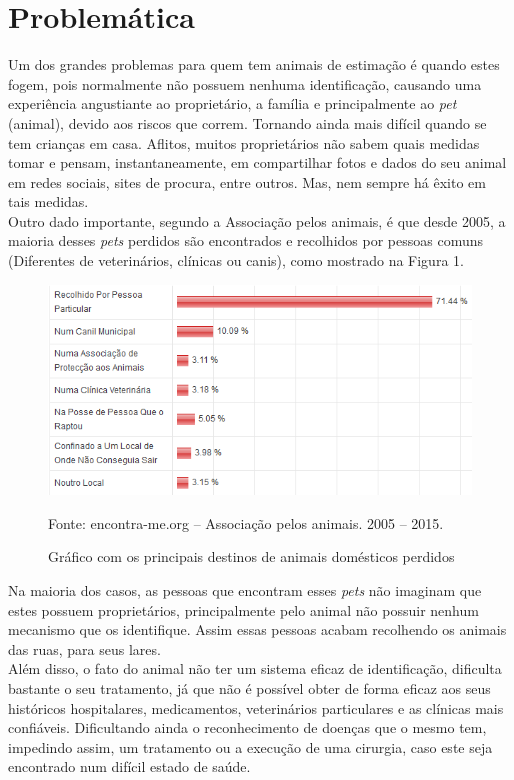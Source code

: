 \section{Problemática}

Um dos grandes problemas para quem tem animais de estimação é quando estes fogem, pois normalmente não possuem nenhuma identificação, causando uma experiência angustiante ao proprietário, a família e principalmente ao {\it pet} (animal), devido aos riscos que correm. Tornando ainda mais difícil quando se tem crianças em casa. Aflitos, muitos proprietários não sabem quais medidas tomar e pensam, instantaneamente, em compartilhar fotos e dados do seu animal em redes sociais, sites de procura, entre outros. Mas, nem sempre há êxito em tais medidas.
\\
\indent
Outro dado importante, segundo a Associação pelos animais, é que desde 2005, a maioria desses {\it pets} perdidos são encontrados e recolhidos por pessoas comuns (Diferentes de veterinários, clínicas ou canis), como mostrado na Figura 1.


\begin{figure}[!htb]
	\centering
	\includegraphics[scale=0.70
	]{imagens/animais}
	\caption{Gráfico com os principais destinos de animais domésticos perdidos}
	Fonte: encontra-me.org – Associação pelos animais. 2005 – 2015.
	\label{Rotulo}
\end{figure}
\newpage
Na maioria dos casos, as pessoas que encontram esses {\it pets} não imaginam que estes possuem proprietários, principalmente pelo animal não possuir nenhum mecanismo que os identifique. Assim essas pessoas acabam recolhendo os animais das ruas, para seus lares. 
\\
\indent
Além disso, o fato do animal não ter um sistema eficaz de identificação, dificulta bastante o seu tratamento, já que não é possível obter de forma eficaz aos seus históricos hospitalares, medicamentos, veterinários particulares e as clínicas mais confiáveis. Dificultando ainda o reconhecimento de doenças que o mesmo tem, impedindo assim, um tratamento ou a execução de uma cirurgia, caso este seja encontrado num difícil estado de saúde.  

